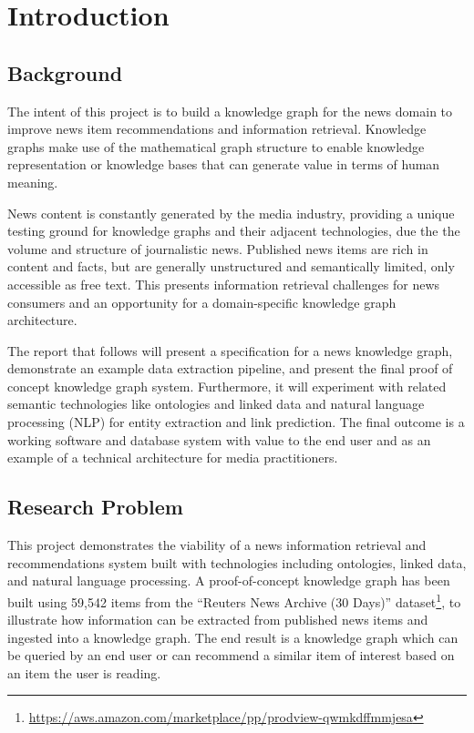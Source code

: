\documentclass[11pt]{article}
\begin{document}
\newpage
\tableofcontents

\newpage
\section{Introduction}

\subsection{Background}

The intent of this project is to build a knowledge graph for the news domain to improve news item recommendations and information retrieval. Knowledge graphs make use of the mathematical graph structure to enable knowledge representation or knowledge bases that can generate value in terms of human meaning.

News content is constantly generated by the media industry, providing a unique testing ground for knowledge graphs and their adjacent technologies, due the the volume and structure of journalistic news. Published news items are rich in content and facts, but are generally unstructured and semantically limited, only accessible as free text. This presents information retrieval challenges for news consumers and an opportunity for a domain-specific knowledge graph architecture.

The report that follows will present a specification for a news knowledge graph, demonstrate an example data extraction pipeline, and present the final proof of concept knowledge graph system. Furthermore, it will experiment with related semantic technologies like ontologies and linked data and natural language processing (NLP) for entity extraction and link prediction. The final outcome is a working software and database system with value to the end user and as an example of a technical architecture for media practitioners.

\subsection{Research Problem}

This project demonstrates the viability of a news information retrieval and recommendations system built with technologies including ontologies, linked data, and natural language processing. A proof-of-concept knowledge graph has been built using 59,542 items from the ``Reuters News Archive (30 Days)'' dataset\footnote{\url{https://aws.amazon.com/marketplace/pp/prodview-qwmkdffmmjesa}}, to illustrate how information can be extracted from published news items and ingested into a knowledge graph. The end result is a knowledge graph which can be queried by an end user or can recommend a similar item of interest based on an item the user is reading.
\end{document}
